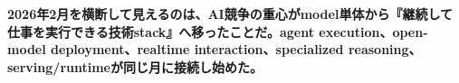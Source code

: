 \noindent\textbf{2026年2月を横断して見えるのは、AI競争の重心がmodel単体から『継続して仕事を実行できる技術stack』へ移ったことだ。agent execution、open-model deployment、realtime interaction、specialized reasoning、serving/runtimeが同じ月に接続し始めた。}\autocite{src-15823ae5556e,src-5041feb6f87f,src-d8b7c1c36830,src-dd5d9b8662f3,src-eac8dfbeb78c}

